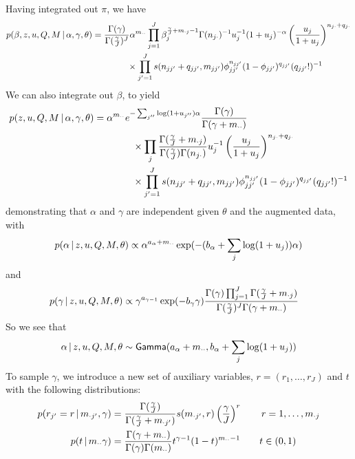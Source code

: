 Having integrated out $\pi$, we have
\begin{align}
  p(\beta, z, u, Q, M \, \vert \, \alpha, \gamma, \theta) &=
  \frac{\Gamma(\gamma)}{\Gamma(\frac{\gamma}{J})^J} \alpha^{m_{\cdot\cdot}} \prod_{j=1}^J \beta_j^{\frac{\gamma}{J} +
    m_{\cdot j} - 1}\Gamma(n_{j\cdot})^{-1} u_j^{-1}(1+u_j)^{-\alpha}
  \left(\frac{u_j}{1+u_j}\right)^{n_{j\cdot} + q_{j\cdot}} \\ &\qquad
  \qquad \times \prod_{j' =
    1}^J s(n_{jj'} + q_{jj'}, m_{jj'}) \phi_{jj'}^{n_{jj'}}(1-\phi_{jj'})^{q_{jj'}}
  (q_{jj'}!)^{-1}
\end{align}
We can also integrate out $\beta$, to yield
\begin{align}
  p(z, u, Q, M \, \vert \, \alpha, \gamma, \theta) &=
  \alpha^{m_{\cdot\cdot}} e^{-\sum_{j''} \log(1+u_{j''}) \alpha}
  \frac{\Gamma(\gamma)}{\Gamma(\gamma + m_{\cdot\cdot})} \\ &\qquad
  \qquad \times \prod_j
  \frac{\Gamma(\frac{\gamma}{J} + m_{\cdot
      j})}{\Gamma(\frac{\gamma}{J}) \Gamma(n_{j\cdot})} u_j^{-1}
  \left(\frac{u_j}{1+u_j}\right)^{n_{j\cdot} + q_{j\cdot}} \\ &\qquad
  \qquad \times \prod_{j' =
    1}^J s(n_{jj'} + q_{jj'}, m_{jj'}) \phi_{jj'}^{n_{jj'}}(1-\phi_{jj'})^{q_{jj'}}
  (q_{jj'}!)^{-1}
\end{align}
demonstrating that $\alpha$ and $\gamma$ are independent given $\theta$
and the augmented data, with
\begin{equation}
  \label{eq:43}
  p(\alpha \, \vert \, z, u, Q, M, \theta) \propto
  \alpha^{a_{\alpha} + m_{\cdot\cdot}}\exp(-(b_\alpha + \sum_{j}\log(1+u_j))\alpha)
\end{equation}
and
\begin{align}
  \label{eq:8}
  p(\gamma \, \vert \, z, u, Q, M, \theta) &\propto \gamma^{a_{\gamma - 1}}
  \exp(-b_{\gamma}\gamma) \frac{\Gamma(\gamma)\prod_{j=1}^J
    \Gamma(\frac{\gamma}{J} + m_{\cdot j})}{\Gamma(\frac{\gamma}{J})^J\Gamma(\gamma + m_{\cdot\cdot})}
\end{align}
So we see that
\begin{equation}
  \label{eq:44}
  \alpha \, \vert \, z, u, Q, M, \theta \sim \mathsf{Gamma}(a_{\alpha}
    + m_{\cdot\cdot},b_\alpha + \sum_j\log(1+u_j))
\end{equation}
To sample $\gamma$, we introduce a new set of auxiliary variables, $r = (r_1, \dots,
r_J)$ and $t$ with the following distributions:
\begin{align}
  \label{eq:9}
  p(r_{j'} = r \, \vert \, m_{\cdot {j'}}, \gamma) &=
  \frac{\Gamma(\frac{\gamma}{J})}{\Gamma(\frac{\gamma}{J}
    + m_{\cdot {j'}})} s(m_{\cdot {j'}}, r)
    \left(\frac{\gamma}{J}\right)^r \qquad r  = 1, \dots, m_{\cdot j} \\
  p(t \, \vert \, m_{\cdot\cdot} \gamma) &= \frac{\Gamma(\gamma +
    m_{\cdot\cdot})}{\Gamma(\gamma) \Gamma(m_{\cdot\cdot})} t^{\gamma
    - 1} (1-t)^{m_{\cdot\cdot} - 1} \qquad t \in (0,1)
\end{align}

